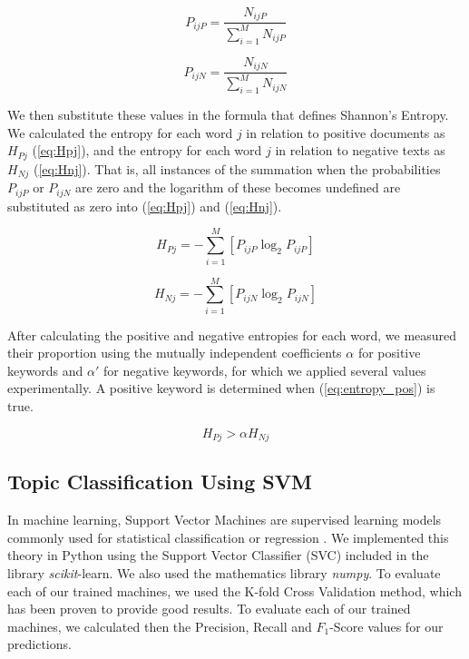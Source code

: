 \documentclass[review]{elsarticle}
\begin{document}
\begin{equation}\label{eq:PijP}
P_{ijP} = \frac{N_{ijP}}{\sum_{i=1}^M N_{ijP}}
\end{equation}

\begin{equation}\label{eq:PijN}
P_{ijN} = \frac{N_{ijN}}{\sum_{i=1}^M N_{ijN}}
\end{equation}

We then substitute these values in the formula that defines Shannon’s Entropy. We calculated the entropy for each word \(j\) in relation to positive documents as \(H_{Pj}\) (\ref{eq:Hpj}), and the entropy for each word \(j\) in relation to negative texts as \(H_{Nj}\) (\ref{eq:Hnj}). That is, all instances of the summation when the probabilities \(P_{ijP}\) or \(P_{ijN}\) are zero and the logarithm of these becomes undefined are substituted as zero into (\ref{eq:Hpj}) and (\ref{eq:Hnj}).

\begin{equation}\label{eq:Hpj}
H_{Pj} = - \sum_{i=1}^M [P_{ijP}\log_2 P_{ijP}]
\end{equation}

\begin{equation}\label{eq:Hnj}
H_{Nj} = - \sum_{i=1}^M [P_{ijN}\log_2 P_{ijN}]
\end{equation}

After calculating the positive and negative entropies for each word, we measured their proportion using the mutually independent coefficients \(\alpha\) for positive keywords and \(\alpha'\) for negative keywords, for which we applied several values experimentally. A positive keyword is determined when (\ref{eq:entropy_pos}) is true.

\begin{equation}\label{eq:entropy_pos}
H_{Pj} > \alpha H_{Nj}
\end{equation}

\subsection{Topic Classification Using SVM}\label{topics}

In machine learning, Support Vector Machines are supervised learning models commonly used for statistical classification or regression \cite[][]{cortes1995}. We implemented this theory in Python using the Support Vector Classifier (SVC) included in the library \textit{scikit}-learn. We also used the mathematics library \textit{numpy}. To evaluate each of our trained machines, we used the K-fold Cross Validation method, which has been proven to provide good results. To evaluate each of our trained machines, we calculated then the Precision, Recall and \(F_1\)-Score values for our predictions.
\end{document}
